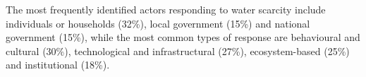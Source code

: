 



The most frequently identified actors responding to water scarcity include individuals or households (32\%), local government (15\%) and national government (15\%), while the most common types of response are behavioural and cultural (30\%), technological and infrastructural (27\%), ecosystem-based (25\%) and institutional (18\%).


